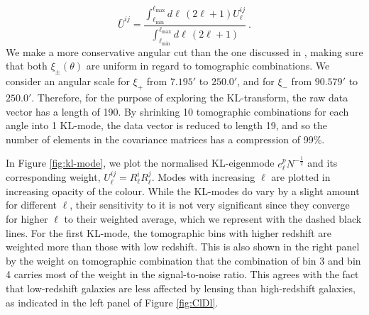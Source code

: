 \documentclass[twocolumn,nofootinbib]{\docclass}
\newcommand{\rf}[1]{Figure \ref{fig:#1}}
\newcommand\be{\begin{equation}}
\newcommand\ee{\end{equation}}
\newcommand\ctot{\mathcal{C}}
\begin{document}
	\be
	\bar{U}^{ij} = \frac{\int_{\ell _{\mathrm{min}}}^{\ell _{\mathrm{max}}} d\ell\, (2 \ell +1) U^{ij}_{\ell}}{\int_{\ell _{\mathrm{min}}}^{\ell _{\mathrm{max}}} d\ell\, (2 \ell +1)}\
	.\ee
	We make a more conservative angular cut than the one discussed in \cite{Troxel:2017xyo}, making sure that both $\xi_{\pm}(\theta)$ are uniform in regard to tomographic combinations. We consider an angular scale for  $\xi_+$ from $7.195'$ to $250.0'$, and for $\xi_-$ from $90.579'$ to $250.0'$. Therefore, for the purpose of exploring the KL-transform, the raw data vector has a length of 190. By shrinking 10 tomographic combinations for each angle into 1 KL-mode, the data vector is reduced to length 19, and so the number of elements in the covariance matrices has a compression of 99\%.
	
	In \rf{kl-mode}, we plot the normalised KL-eigenmode %
	$e^p_{\ell} N^{-\frac{1}{2}}$ and its corresponding weight, $U^{ij}_\ell=R_\ell^i R_\ell^j$. %
	Modes with increasing $\ell$ are plotted in increasing opacity of the colour. While the KL-modes do vary by a slight amount for different $\ell$, their sensitivity to it is not very significant since they converge for higher $\ell$ to their weighted average, which we represent with the dashed black lines. %
	For the first KL-mode, the tomographic bins with higher redshift are weighted more than those with low redshift. This is also shown in the right panel by the weight on tomographic combination that the combination of bin 3 and bin 4 carries most of the weight in the signal-to-noise ratio. This agrees with the fact that low-redshift galaxies are less affected by lensing than high-redshift galaxies, as indicated in the left panel of \rf{ClDl}.
	
\end{document}
